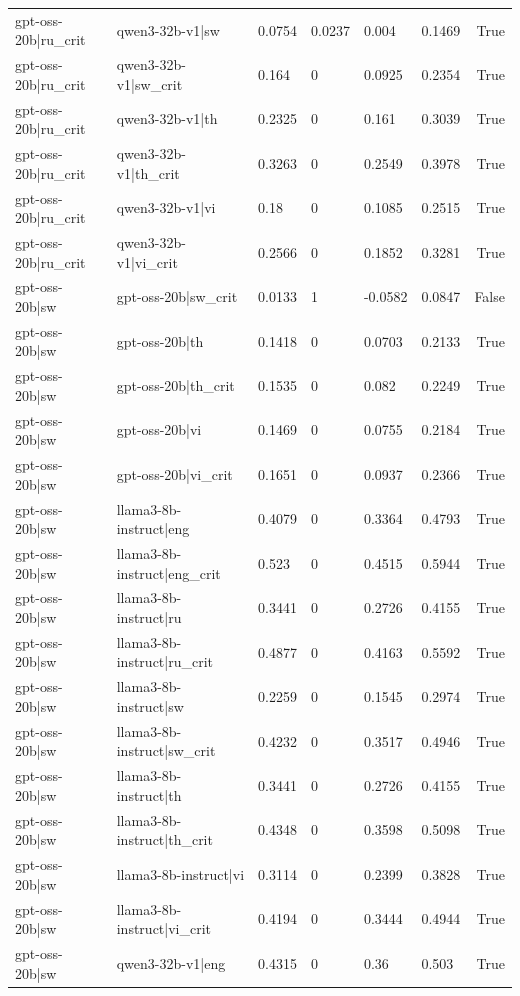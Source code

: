 \begin{table}
\begin{tabular}{llllllr}
gpt-oss-20b|ru_crit & qwen3-32b-v1|sw & 0.0754 & 0.0237 & 0.004 & 0.1469 & True \\
gpt-oss-20b|ru_crit & qwen3-32b-v1|sw_crit & 0.164 & 0 & 0.0925 & 0.2354 & True \\
gpt-oss-20b|ru_crit & qwen3-32b-v1|th & 0.2325 & 0 & 0.161 & 0.3039 & True \\
gpt-oss-20b|ru_crit & qwen3-32b-v1|th_crit & 0.3263 & 0 & 0.2549 & 0.3978 & True \\
gpt-oss-20b|ru_crit & qwen3-32b-v1|vi & 0.18 & 0 & 0.1085 & 0.2515 & True \\
gpt-oss-20b|ru_crit & qwen3-32b-v1|vi_crit & 0.2566 & 0 & 0.1852 & 0.3281 & True \\
gpt-oss-20b|sw & gpt-oss-20b|sw_crit & 0.0133 & 1 & -0.0582 & 0.0847 & False \\
gpt-oss-20b|sw & gpt-oss-20b|th & 0.1418 & 0 & 0.0703 & 0.2133 & True \\
gpt-oss-20b|sw & gpt-oss-20b|th_crit & 0.1535 & 0 & 0.082 & 0.2249 & True \\
gpt-oss-20b|sw & gpt-oss-20b|vi & 0.1469 & 0 & 0.0755 & 0.2184 & True \\
gpt-oss-20b|sw & gpt-oss-20b|vi_crit & 0.1651 & 0 & 0.0937 & 0.2366 & True \\
gpt-oss-20b|sw & llama3-8b-instruct|eng & 0.4079 & 0 & 0.3364 & 0.4793 & True \\
gpt-oss-20b|sw & llama3-8b-instruct|eng_crit & 0.523 & 0 & 0.4515 & 0.5944 & True \\
gpt-oss-20b|sw & llama3-8b-instruct|ru & 0.3441 & 0 & 0.2726 & 0.4155 & True \\
gpt-oss-20b|sw & llama3-8b-instruct|ru_crit & 0.4877 & 0 & 0.4163 & 0.5592 & True \\
gpt-oss-20b|sw & llama3-8b-instruct|sw & 0.2259 & 0 & 0.1545 & 0.2974 & True \\
gpt-oss-20b|sw & llama3-8b-instruct|sw_crit & 0.4232 & 0 & 0.3517 & 0.4946 & True \\
gpt-oss-20b|sw & llama3-8b-instruct|th & 0.3441 & 0 & 0.2726 & 0.4155 & True \\
gpt-oss-20b|sw & llama3-8b-instruct|th_crit & 0.4348 & 0 & 0.3598 & 0.5098 & True \\
gpt-oss-20b|sw & llama3-8b-instruct|vi & 0.3114 & 0 & 0.2399 & 0.3828 & True \\
gpt-oss-20b|sw & llama3-8b-instruct|vi_crit & 0.4194 & 0 & 0.3444 & 0.4944 & True \\
gpt-oss-20b|sw & qwen3-32b-v1|eng & 0.4315 & 0 & 0.36 & 0.503 & True \\

\end{tabular}
\end{table}
